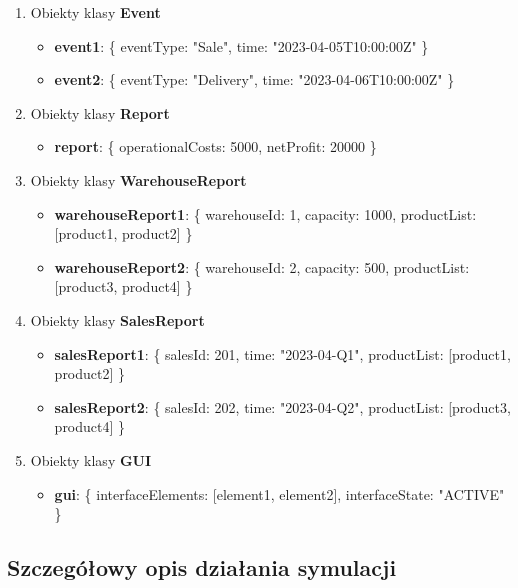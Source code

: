 \documentclass[11pt]{article}
\begin{document}
\begin{enumerate}
\item Obiekty klasy \textbf{Event}
\begin{itemize}
    \item \textbf{event1}: \{ eventType: "Sale", time: "2023-04-05T10:00:00Z" \}
    \item \textbf{event2}: \{ eventType: "Delivery", time: "2023-04-06T10:00:00Z" \}
\end{itemize}

\item Obiekty klasy \textbf{Report}
\begin{itemize}
    \item \textbf{report}: \{ operationalCosts: 5000, netProfit: 20000 \}
\end{itemize}

\item Obiekty klasy \textbf{WarehouseReport}
\begin{itemize}
    \item \textbf{warehouseReport1}: \{ warehouseId: 1, capacity: 1000, productList: [product1, product2] \}
    \item \textbf{warehouseReport2}: \{ warehouseId: 2, capacity: 500, productList: [product3, product4] \}
\end{itemize}

\item Obiekty klasy \textbf{SalesReport}
\begin{itemize}
    \item \textbf{salesReport1}: \{ salesId: 201, time: "2023-04-Q1", productList: [product1, product2] \}
    \item \textbf{salesReport2}: \{ salesId: 202, time: "2023-04-Q2", productList: [product3, product4] \}
\end{itemize}

\item Obiekty klasy \textbf{GUI}
\begin{itemize}
    \item \textbf{gui}: \{ interfaceElements: [element1, element2], interfaceState: "ACTIVE" \}
\end{itemize}
    
\end{enumerate}

\subsection{Szczegółowy opis działania symulacji}
\end{document}
